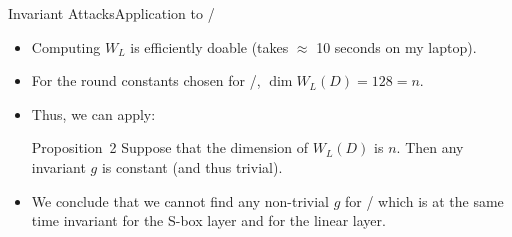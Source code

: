 \begin{frame}{Invariant Attacks}{Application to \clyde/}
    \begin{itemize}
        \item Computing $W_L$ is efficiently doable (takes $\approx$ 10 seconds on my laptop).
        \item For the round constants chosen for \clyde/, $\dim W_L(D) = 128 = n$.
    \end{itemize}
    \begin{itemize}
        \item Thus, we can apply:
              \begin{block}{Proposition~2 \cite{C:BCLR17}}
                  Suppose that the dimension of $W_L(D)$ is $n$.
                  Then any invariant $g$ is constant (and thus trivial).
              \end{block}
    \end{itemize}
    \begin{itemize}
        \item We conclude that we cannot find any non-trivial $g$ for \clyde/ which is at the same time invariant for the S-box layer and for the linear layer.
    \end{itemize}
\end{frame}

